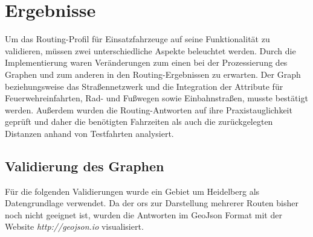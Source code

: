 \section{Ergebnisse}

Um das Routing-Profil für Einsatzfahrzeuge auf seine Funktionalität zu validieren, müssen zwei unterschiedliche Aspekte beleuchtet werden.
Durch die Implementierung waren Veränderungen zum einen bei der Prozessierung des Graphen und zum anderen in den Routing-Ergebnissen zu erwarten.
Der Graph beziehungsweise das Straßennetzwerk und die Integration der Attribute für Feuerwehreinfahrten, Rad- und Fußwegen sowie Einbahnstraßen, musste bestätigt werden.
Außerdem wurden die Routing-Antworten auf ihre Praxistauglichkeit geprüft und daher die benötigten Fahrzeiten als auch die zurückgelegten Distanzen anhand von Testfahrten analysiert.


\subsection{Validierung des Graphen}

Für die folgenden Validierungen wurde ein Gebiet um Heidelberg als Datengrundlage verwendet.
Da der \gls{ors} zur Darstellung mehrerer Routen bisher noch nicht geeignet ist, wurden die Antworten im GeoJson Format mit der Website \textit{http://geojson.io} visualisiert.

